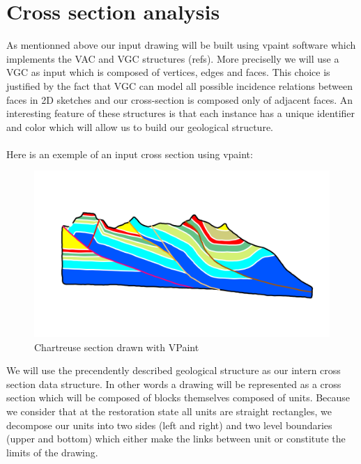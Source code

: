 \documentclass[12pt, a4paper]{report} %
\begin{document}
\chapter{Cross section analysis}

As mentionned above our input drawing will be built using vpaint software which implements the VAC and VGC structures (refs).
More preciselly we will use a VGC as input which is composed of vertices, edges and faces. This choice is justified by the fact that VGC can model all possible incidence relations between faces in 2D sketches and our cross-section is composed only of adjacent faces. An interesting feature of these structures is that each instance has a unique identifier and color which will allow us to build our geological structure.\\\\
Here is an exemple of an input cross section using vpaint:

 \begin{figure}[H]
	\centering
	\includegraphics[scale=0.5]{chartreusevpaint.png}
	\caption{Chartreuse section drawn with VPaint}
\end{figure}

We will use the precendently described geological structure as our intern cross section data structure. In other words a drawing will be represented as a cross section which will be composed of blocks themselves composed of units. Because we consider that at the restoration state all units are straight rectangles, we decompose our units into two sides (left and right) and two level boundaries (upper and bottom) which either make the links between unit or constitute the limits of the drawing. 
\end{document}
